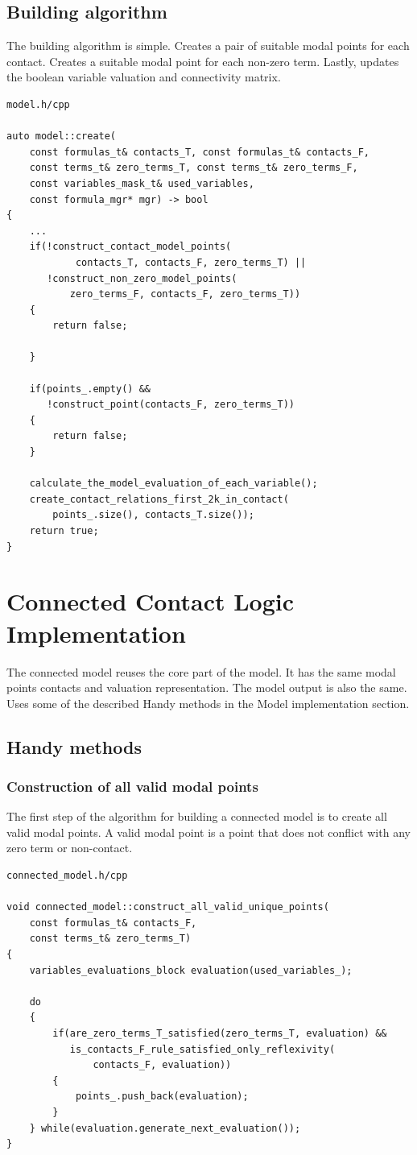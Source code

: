 \documentclass{article}
\begin{document}
	\subsection{Building algorithm}
	The building algorithm is simple. Creates a pair of suitable modal points for each contact. Creates a suitable modal point for each non-zero term. Lastly, updates the boolean variable valuation and connectivity matrix.
\\
\begin{lstlisting}
model.h/cpp

auto model::create(
	const formulas_t& contacts_T, const formulas_t& contacts_F,
	const terms_t& zero_terms_T, const terms_t& zero_terms_F,
	const variables_mask_t& used_variables,
	const formula_mgr* mgr) -> bool
{
    ...
    if(!construct_contact_model_points(
            contacts_T, contacts_F, zero_terms_T) ||
       !construct_non_zero_model_points(
           zero_terms_F, contacts_F, zero_terms_T))
    {
        return false;

    }

    if(points_.empty() &&
       !construct_point(contacts_F, zero_terms_T))
    {
        return false;
    }

    calculate_the_model_evaluation_of_each_variable();
    create_contact_relations_first_2k_in_contact(
        points_.size(), contacts_T.size());
    return true;
}
\end{lstlisting}

	\newpage
	\section{Connected Contact Logic Implementation}
	The connected model reuses the core part of the model. It has the same modal points contacts and valuation representation. The model output is also the same. Uses some of the described Handy methods in the Model implementation section.

	\subsection{Handy methods}
	\subsubsection*{Construction of all valid modal points}
	The first step of the algorithm for building a connected model is to create all valid modal points. A valid modal point is a point that does not conflict with any zero term or non-contact.
\\
\begin{lstlisting}
connected_model.h/cpp

void connected_model::construct_all_valid_unique_points(
	const formulas_t& contacts_F,
	const terms_t& zero_terms_T)
{
    variables_evaluations_block evaluation(used_variables_);

    do
    {
        if(are_zero_terms_T_satisfied(zero_terms_T, evaluation) &&
           is_contacts_F_rule_satisfied_only_reflexivity(
               contacts_F, evaluation))
        {
            points_.push_back(evaluation);
        }
    } while(evaluation.generate_next_evaluation());
}
\end{lstlisting}
\end{document}
